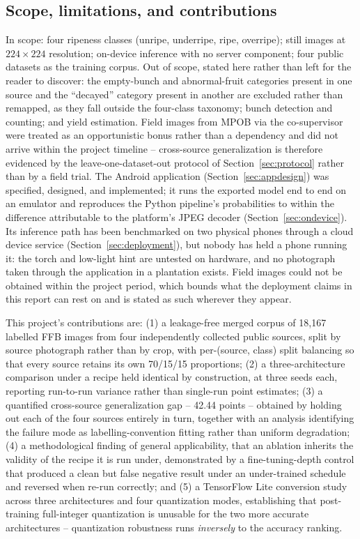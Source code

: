 \documentclass{article}
\begin{document}
\subsection{Scope, limitations, and contributions}

In scope: four ripeness classes (unripe, underripe, ripe, overripe); still images at $224\times224$
resolution; on-device inference with no server component; four public datasets as the training corpus.
Out of scope, stated here rather than left for the reader to discover: the empty-bunch and abnormal-fruit
categories present in one source and the ``decayed'' category present in another are excluded rather than
remapped, as they fall outside the four-class taxonomy; bunch detection and counting; and yield
estimation. Field images from MPOB via the co-supervisor were treated as an opportunistic bonus rather
than a dependency and did not arrive within the project timeline -- cross-source generalization is
therefore evidenced by the leave-one-dataset-out protocol of Section~\ref{sec:protocol} rather than by a
field trial. The Android application (Section~\ref{sec:appdesign}) was specified, designed, and
implemented; it runs the exported model end to end on an emulator and reproduces the Python pipeline's
probabilities to within the difference attributable to the platform's JPEG decoder
(Section~\ref{sec:ondevice}). Its inference path has been benchmarked on two physical phones
through a cloud device service (Section~\ref{sec:deployment}), but nobody has held a phone running it: the
torch and low-light hint are untested on hardware, and no photograph taken through the application in a
plantation exists. Field images could not be obtained
within the project period, which bounds what the deployment claims in this report can rest on and is
stated as such wherever they appear.

This project's contributions are: (1) a leakage-free merged corpus of 18{,}167 labelled FFB images from
four independently collected public sources, split by source photograph rather than by crop, with
per-(source, class) split balancing so that every source retains its own 70/15/15 proportions; (2) a
three-architecture comparison under a recipe held identical by construction, at three seeds each,
reporting run-to-run variance rather than single-run point estimates; (3) a quantified cross-source
generalization gap -- 42.44 points -- obtained by holding out each of the four sources entirely in turn,
together with an analysis identifying the failure mode as labelling-convention fitting rather than uniform
degradation; (4) a methodological finding of general applicability, that an ablation inherits the validity
of the recipe it is run under, demonstrated by a fine-tuning-depth control that produced a clean but false
negative result under an under-trained schedule and reversed when re-run correctly; and (5) a TensorFlow
Lite conversion study across three architectures and four quantization modes, establishing that
post-training full-integer quantization is unusable for the two more accurate architectures --
quantization robustness runs \textit{inversely} to the accuracy ranking.
\end{document}
